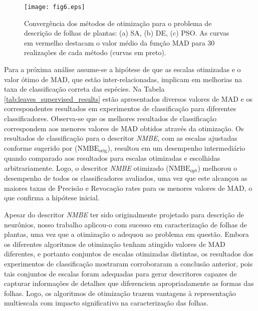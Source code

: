 {\begin{figure}[!htb]
\texttt{[image: fig6.eps]}
\caption{\label{fig:converge}Convergência dos métodos de otimização para o problema de descrição de folhas de plantas: (a) SA, (b) DE, (c) PSO. As curvas em vermelho destacam o valor médio da função MAD para $30$ realizações de cada método (curvas em preto). }
\end{figure}

Para a próxima análise assume-se a hipótese de que as escalas otimizadas e o valor ótimo de MAD, que estão inter-relacionadas, implicam em melhorias na taxa de classificação correta das espécies. Na Tabela \ref{tab:leaves_supervised_results} estão apresentados diversos valores de MAD e os correspondentes resultados em experimentos de classificação para diferentes classificadores. Observa-se que os melhores resultados de classificação correspondem aos menores valores de MAD obtidos através da otimização. Os resultados de classificação para o descritor \emph{NMBE}, com as escalas ajustadas conforme sugerido por  ($\operatorname{NMBE_{orig}}$), resultou em um desempenho intermediário quando comparado aos resultados para escalas otimizadas e escolhidas arbitrariamente. Logo, o descritor \emph{NMBE} otimizado ($\operatorname{NMBE_{opt}}$) melhorou o desempenho de todos os classificadores avaliados, uma vez que este alcançou as maiores taxas de Precisão e Revocação rates para os menores valores de MAD, o que confirma a hipótese inicial.

Apesar do descritor \emph{NMBE} ter sido originalmente projetado para descrição de neurônios, nosso trabalho aplicou-o com sucesso em caracterização de folhas de plantas, uma vez que a otimização o adequou ao problema em questão.
Embora os diferentes algoritmos de otimização tenham atingido valores de MAD diferentes, e portanto conjuntos de escalas otimizadas distintas, os resultados dos experimentos de classificação mostraram corroboraram a conclusão anterior, pois tais conjuntos de escalas foram adequadas para gerar descritores capazes de capturar informações de detalhes que diferenciem apropriadamente as formas das folhas. Logo, os algoritmos de otimização trazem vantagens à representação multiescala com impacto significativo na caracterização das folhas. 

}
